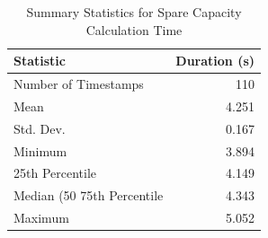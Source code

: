 \begin{table}[htbp]
\centering
\caption{Summary Statistics for Spare Capacity Calculation Time}
\label{tab:coverage_timing_summary}
\begin{tabular}{lr}
\toprule
Statistic & Duration (s) \\
\midrule
Number of Timestamps & 110 \\
Mean & 4.251 \\
Std. Dev. & 0.167 \\
Minimum & 3.894 \\
25th Percentile & 4.149 \\
Median (50%
75th Percentile & 4.343 \\
Maximum & 5.052 \\
\bottomrule
\end{tabular}
\end{table}

